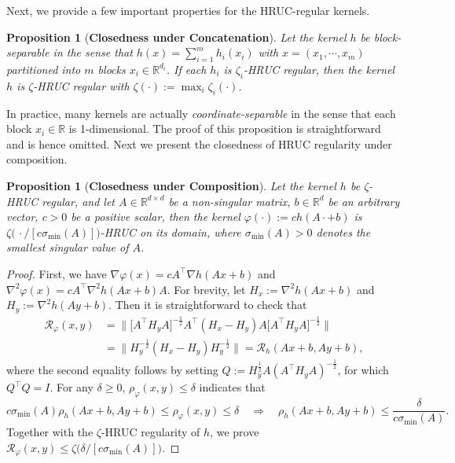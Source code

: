 \documentclass{article}
\theoremstyle{plain}
\newtheorem{proposition}[theorem]{Proposition}
\theoremstyle{definition}
\theoremstyle{remark}
\newcommand{\cR}{\mathcal{R}}
\begin{document}
Next, we provide a few important properties for the HRUC-regular kernels. 


\begin{proposition}[\textbf{Closedness under Concatenation}]
    \label{proposition:Concat}
    Let the kernel $h$ be \emph{block-separable} in the sense that $h(x) = \sum_{i=1}^mh_i(x_i)$ with $x = (x_{1},\cdots,x_m)$ partitioned into $m$ blocks  $x_i\in\mathbb{R}^{d_i}$. If each $h_i$ is $\zeta_i$-HRUC regular, then the kernel $h$ is $\zeta$-HRUC regular with $\zeta(\cdot):=\max_i\zeta_i(\cdot)$.
\end{proposition}
In practice, many kernels are actually \emph{coordinate-separable} in the sense that each block $x_i\in\mathbb{R}$ is 1-dimensional. The proof of this proposition is straightforward and is hence omitted. Next we present the closedness of HRUC regularity under composition. 
\begin{proposition}[\textbf{Closedness under Composition}]
    \label{proposition:Affine} 
    Let the kernel $h$ be $\zeta$-HRUC regular, and let $A\in\mathbb{R}^{d\times d}$ be a non-singular matrix, $b\in\mathbb{R}^d$ be an arbitrary vector, $c>0$ be a positive scalar, then the kernel $\varphi(\cdot):=ch(A\cdot+b)$ is $\zeta\big(\,\cdot/[c\sigma_{\min}(A)]\big)$-HRUC on its domain, where $\sigma_{\min}(A)>0$ denotes the smallest singular value of $A$.
\end{proposition}
\begin{proof}
    First,  
    we have $\nabla \varphi(x) = cA^\top\nabla h(Ax+b)$ and $\nabla^2\varphi(x) = cA^\top\nabla^2h(Ax+b)A$. For brevity, let $H_x:=\nabla^2h(Ax+b)$ and $H_y:=\nabla^2h(Ay+b)$. Then it is straightforward to check that 
    \begin{equation*}
    \begin{aligned}
        \cR_\varphi(x,y)
        &=\Big\|\big[A^\top H_yA\big]^{-\frac12}A^\top(H_x-H_y)A\big[A^\top H_yA\big]^{-\frac12}\Big\|\\
        &=\Big\|H_y^{-\frac12}(H_x-H_y)H_y^{-\frac12}\Big\|
        =\cR_h(Ax+b,Ay+b),
    \end{aligned}
    \end{equation*}
    where the second equality follows by setting $Q:=H_y^{\frac12}A(A^\top H_yA)^{-\frac12}$, for which $Q^\top Q=I$.
     For any $\delta\geq0$, $\rho_\varphi(x,y)\leq \delta$ indicates that
     \[
     c\sigma_{\min}(A)\rho_h(Ax+b,Ay+b)
     \leq \rho_\varphi(x,y)\leq\delta
     \quad\Longrightarrow\quad
     \rho_h(Ax+b,Ay+b)\leq\frac{\delta}{c\sigma_{\min}(A)}.
     \]
     Together with the $\zeta$-HRUC regularity of $h$, we prove
     $\cR_\varphi(x,y) \leq \zeta\big(\delta/[c\sigma_{\min}(A)]\big)$.
\end{proof}
\end{document}
